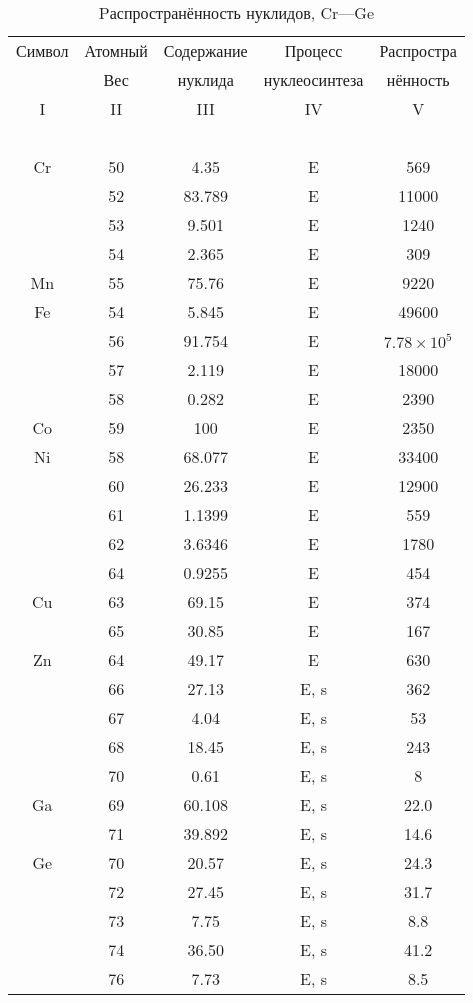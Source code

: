 \documentclass[a5paper,openany]{book}
\begin{document}
\begin{table}[h!]
	{\small
		\begin{tabular}{ccccc}
			Символ  & Атомный &  Содержание  & Процесс & Распростра   \\
			~ & Вес &  нуклида  &  нуклеосинтеза  & нённость  \\
			\hline 
			I & II &  III  & IV & V \\
			\hline 
			~ & ~ & ~ & ~ & ~  \\
			Cr & 50 & 4.35 & E & 569 \\ [1mm]
			& 52 & 83.789 & E & 11000 \\ [1mm] 			
			& 53 & 9.501 & E & 1240 \\ [1mm] 
			& 54 & 2.365 & E & 309 \\ [1mm]
			Mn & 55 & 75.76 & E &  9220 \\ [1mm]
			Fe & 54 & 5.845 & E &  49600 \\ [1mm]
			& 56 & 91.754 & E & $7.78 \times 10^5$ \\ [1mm] 			
			& 57 & 2.119 & E & 18000 \\ [1mm] 
			& 58 & 0.282 & E & 2390 \\ [1mm]			
			Co & 59 & 100 & E &  2350 \\ [1mm]
			Ni& 58 & 68.077 & E &  33400 \\ [1mm]
			& 60 & 26.233 & E & 12900 \\ [1mm] 			
			& 61 & 1.1399 & E & 559 \\ [1mm] 
			& 62 & 3.6346 & E & 1780 \\ [1mm]
			& 64 & 0.9255 & E & 454 \\ [1mm]
			Cu& 63 & 69.15 & E &  374 \\ [1mm]
			& 65 & 30.85 & E & 167 \\ [1mm]
			Zn & 64 & 49.17 & E &  630 \\ [1mm]
			& 66 & 27.13 & E, s & 362 \\ [1mm] 			
			& 67 & 4.04 & E, s & 53 \\ [1mm] 
			& 68 & 18.45 & E, s & 243 \\ [1mm] 
			& 70 & 0.61 & E, s & 8 \\ [1mm] 
			Ga & 69 & 60.108 & E, s &  22.0 \\ [1mm]
			& 71 & 39.892 & E, s & 14.6 \\ [1mm]
			Ge & 70 & 20.57 & E, s &  24.3 \\ [1mm]
			& 72 & 27.45 & E, s & 31.7 \\ [1mm] 
			& 73 & 7.75 & E, s & 8.8 \\ [1mm] 
			& 74 & 36.50 & E, s & 41.2 \\ [1mm] 
			& 76 & 7.73 & E, s & 8.5 \\ [1mm] 
			\hline 
		\end{tabular}
	}
	\caption{Pаспространённость нуклидов, Cr---Ge}
	\label{t:AbudanceSolarCrGe}
\end{table}
\end{document}
